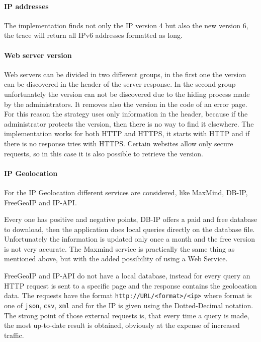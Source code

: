 \documentclass[
	a4paper,					10pt,							twoside,					openright,				notitlepage,			parskip=half,			]{scrreprt}
\begin{document}
\paragraph{\gls{IP} addresses}

The implementation finds not only the \gls{IP} version 4 but also the new version 6, the trace will return all IPv6 addresses formatted as long.

\paragraph{Web server version}

Web servers can be divided in two different groups, in the first one the version 
can be discovered in the header of the server response.
In the second group unfortunately the version can not be discovered due to the hiding process made by the administrators. 
It removes also the version in the code of an error page. For this reason the strategy uses only information in the header, 
because if the administrator protects the version, then there is no way to find it elsewhere. 
The implementation works for both \gls{HTTP} and \gls{HTTPS}, it starts with \gls{HTTP} and if there is no response tries with \gls{HTTPS}. 
Certain websites allow only secure requests, so in this case it is also possible to retrieve the version.

\paragraph{\gls{IP} Geolocation}

For the \gls{IP} Geolocation different services are considered, like MaxMind, DB-IP, FreeGeoIP and IP-API.

Every one has positive and negative points, DB-IP offers a paid and free database to download, 
then the application does local queries directly on the database file. 
Unfortunately the information is updated only once a month and the free version is not very accurate.
The Maxmind service is practically the same thing as mentioned above, but with the added possibility of using a Web Service.

FreeGeoIP and IP-API do not have a local database, instead for every query an \gls{HTTP} request is sent to a specific page 
and the response contains the geolocation data. 
The requests have the format \verb|http://URL/<format>/<ip>| where format is one of \verb|json|, \verb|csv|, \verb|xml|
and for the \gls{IP} is given using the Dotted-Decimal notation\cite{wiki:dotdecimal}.
\newpage
The strong point of those external requests is, that every time a query is made, the most up-to-date 
result is obtained, obviously at the expense of increased traffic.
\end{document}
